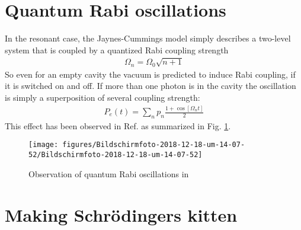 \documentclass[10pt]{article}
\let\cite\citep
\providecommand\citep{\cite}
\begin{document}
\section{Quantum Rabi oscillations}

In the resonant case, the Jaynes-Cummings model simply describes a two-level system that is coupled by a quantized Rabi coupling strength
\begin{align}
\Omega_n = \Omega_0 \sqrt{n+1}
\end{align}
So even for an empty cavity the vacuum is predicted to induce Rabi coupling, if it is switched on and off. If more than one photon is in the cavity the oscillation is simply a superposition of several coupling strength:
\begin{align}
P_e(t)=\sum_n p_n\frac{1+\cos\left[\Omega_n t\right]}{2}
\end{align}
This effect has been observed in Ref. \cite{Brune_1996} as summarized in Fig. \ref{910858}.
\begin{figure}[h!]
\begin{center}
\texttt{[image: figures/Bildschirmfoto-2018-12-18-um-14-07-52/Bildschirmfoto-2018-12-18-um-14-07-52]}
\caption{{Observation of quantum Rabi oscillations in \protect\cite{Brune_1996}
{\label{910858}}%
}}
\end{center}
\end{figure}



\section{Making Schrödingers kitten}
\end{document}
